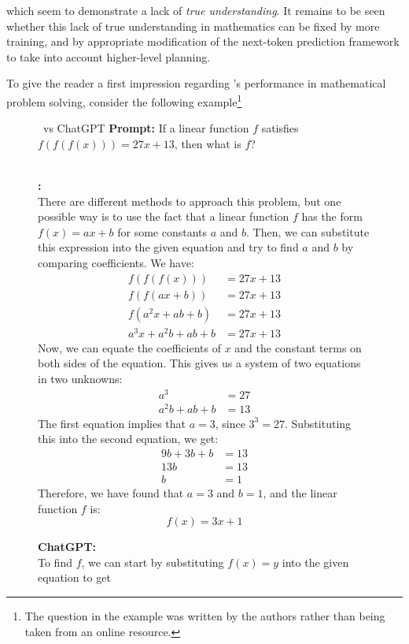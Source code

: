 which seem to demonstrate a lack of {\em true understanding}. It remains to be seen whether this lack of true understanding in mathematics can be fixed by more training, and by appropriate modification of the next-token prediction framework to take into account higher-level planning.


To give the reader a first impression regarding \DV's performance in mathematical problem solving, consider the following example\footnote{The question in the example was written by the authors rather than being taken from an online resource.}
\begin{figure}[H]
\begin{AIbox}{\DV~vs ChatGPT}
{\bf Prompt:} {\scriptsize
If a linear function $f$ satisfies $f(f(f(x))) = 27x + 13$, then what is $f$?  
}\\\ \\
\parbox[t]{0.5\linewidth}{{\bf \DV:}\\
\scriptsize
There are different methods to approach this problem, but one possible way is to use the fact that a linear function $f$ has the form $f(x) = ax + b$ for some constants $a$ and $b$. Then, we can substitute this expression into the given equation and try to find $a$ and $b$ by comparing coefficients. We have:
\begin{align*} f(f(f(x))) &= 27x + 13 \\ f(f(ax + b)) &= 27x + 13 \\ f(a^2x + ab + b) &= 27x + 13 \\ a^3x + a^2b + ab + b &= 27x + 13 \end{align*}
Now, we can equate the coefficients of $x$ and the constant terms on both sides of the equation. This gives us a system of two equations in two unknowns:
\begin{align*} a^3 &= 27 \\ a^2b + ab + b &= 13 \end{align*}
The first equation implies that $a = 3$, since $3^3 = 27$. Substituting this into the second equation, we get:
\begin{align*} 9b + 3b + b &= 13 \\ 13b &= 13 \\ b &= 1 \end{align*}
Therefore, we have found that $a = 3$ and $b = 1$, and the linear function $f$ is: \[f(x) = 3x + 1\]
}\hspace{0.02\linewidth}%
\parbox[t]{0.45\linewidth}{{\bf ChatGPT:} \\
\scriptsize
To find $f$, we can start by substituting $f(x) = y$ into the given equation to get
}
\end{AIbox}
\end{figure}

